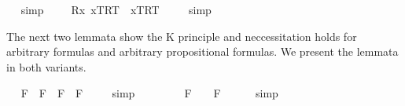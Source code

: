 \begin{isabellebody}
\isadelimproof
\ %
\endisadelimproof
%
\isatagproof
{}\isamarkupfalse%
\ simp%
\endisatagproof
{\isafoldproof}%
%
\isadelimproof
%
\endisadelimproof
\ \isanewline
\ \isamarkupfalse%
\ {\isachardoublequoteopen}{\isacharbrackleft}{\isacharparenleft}\isactrlbold {\isasymforall}R{\isachardot}\isactrlbold {\isasymforall}x{\isachardot}\ {\isasymlbrace}x\isactrlsup T{\isacharcomma}R\isactrlsup T{\isasymrbrace}\ \isactrlbold {\isasymrightarrow}\ {\isasymlbrace}x\isactrlsup T{\isacharcomma}R\isactrlsup T{\isasymrbrace}{\isacharparenright}{\isacharbrackright}\ {\isacharequal}\ {\isasymtop}{\isachardoublequoteclose}%
\isadelimproof
\ %
\endisadelimproof
%
\isatagproof
{}\isamarkupfalse%
\ simp%
\endisatagproof
{\isafoldproof}%
%
\isadelimproof
%
\endisadelimproof
%
\isamarkuptrue%
%
\begin{isamarkuptext}%
The next two lemmata show the K principle  and neccessitation holds for arbitrary formulas 
  and arbitrary propositional formulas. We present the lemmata in both variants.%
\end{isamarkuptext}\isamarkuptrue%
\ \isamarkupfalse%
\ {\isachardoublequoteopen}{\isacharbrackleft}{\isacharparenleft}\isactrlbold {\isasymbox}{\isacharparenleft}{\isasymphi}\isactrlsup F\ \isactrlbold {\isasymrightarrow}\ {\isasymphi}\isactrlsup F{\isacharparenright}{\isacharparenright}\ \isactrlbold {\isasymrightarrow}\ {\isacharparenleft}\isactrlbold {\isasymbox}{\isasymphi}\isactrlsup F\ \isactrlbold {\isasymrightarrow}\ \isactrlbold {\isasymbox}{\isasymphi}\isactrlsup F{\isacharparenright}{\isacharbrackright}\ {\isacharequal}\ {\isasymtop}{\isachardoublequoteclose}%
\isadelimproof
\ %
\endisadelimproof
%
\isatagproof
{}\isamarkupfalse%
\ simp\ \isamarkupfalse%
\ \ \ \ %
%
\endisatagproof
{\isafoldproof}%
%
\isadelimproof
%
\endisadelimproof
\isanewline
\isanewline
\ \isamarkupfalse%
\ {\isachardoublequoteopen}{\isacharbrackleft}{\isasymphi}\isactrlsup F{\isacharbrackright}\ {\isacharequal}\ {\isasymtop}\ {\isasymlongrightarrow}\ {\isacharbrackleft}\isactrlbold {\isasymbox}{\isasymphi}\isactrlsup F{\isacharbrackright}\ {\isacharequal}\ {\isasymtop}\ {\isachardoublequoteclose}%
\isadelimproof
\ %
\endisadelimproof
%
\isatagproof
{}\isamarkupfalse%
\ simp\ \isamarkupfalse%
\ \ \ \ %
%
\endisatagproof
{\isafoldproof}%
%
\isadelimproof
%
\endisadelimproof

\end{isabellebody}
